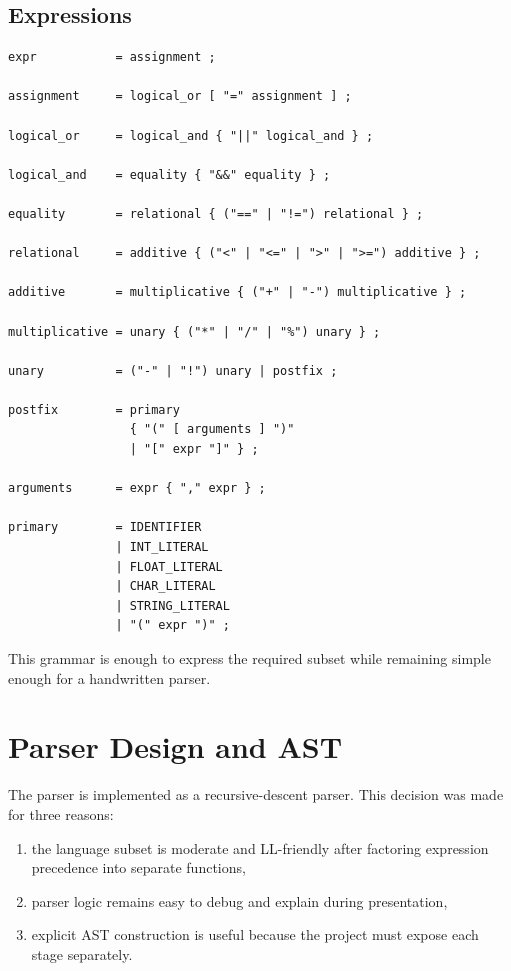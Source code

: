 \documentclass[11pt,a4paper]{article}
\begin{document}
\subsection*{Expressions}

\begin{lstlisting}[language=ebnf]
expr           = assignment ;

assignment     = logical_or [ "=" assignment ] ;

logical_or     = logical_and { "||" logical_and } ;

logical_and    = equality { "&&" equality } ;

equality       = relational { ("==" | "!=") relational } ;

relational     = additive { ("<" | "<=" | ">" | ">=") additive } ;

additive       = multiplicative { ("+" | "-") multiplicative } ;

multiplicative = unary { ("*" | "/" | "%") unary } ;

unary          = ("-" | "!") unary | postfix ;

postfix        = primary
                 { "(" [ arguments ] ")"
                 | "[" expr "]" } ;

arguments      = expr { "," expr } ;

primary        = IDENTIFIER
               | INT_LITERAL
               | FLOAT_LITERAL
               | CHAR_LITERAL
               | STRING_LITERAL
               | "(" expr ")" ;
\end{lstlisting}

This grammar is enough to express the required subset while remaining simple
enough for a handwritten parser.

\section{Parser Design and AST}

The parser is implemented as a recursive-descent parser. This decision was made
for three reasons:

\begin{enumerate}[leftmargin=2em]
    \item the language subset is moderate and LL-friendly after factoring
    expression precedence into separate functions,
    \item parser logic remains easy to debug and explain during presentation,
    \item explicit AST construction is useful because the project must expose
    each stage separately.
\end{enumerate}
\end{document}
